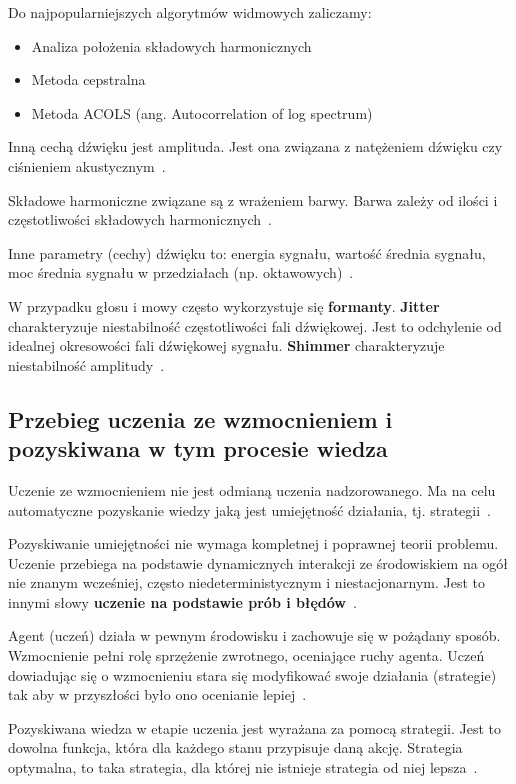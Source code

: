 \documentclass[wi]{zut}
\begin{document}
Do najpopularniejszych algorytmów widmowych zaliczamy:

\begin{itemize}
    \item Analiza położenia składowych harmonicznych
    \item Metoda cepstralna
    \item Metoda ACOLS (ang. Autocorrelation of log spectrum)
\end{itemize}

Inną cechą dźwięku jest amplituda. Jest ona związana z natężeniem dźwięku czy ciśnieniem akustycznym~\cite{Polrolniczak}.

Składowe harmoniczne związane są z wrażeniem barwy. Barwa zależy od ilości i częstotliwości składowych harmonicznych~\cite{Polrolniczak}.

Inne parametry (cechy) dźwięku to: energia sygnału, wartość średnia sygnału, moc średnia sygnału w przedziałach (np. oktawowych)~\cite{Polrolniczak}.

W przypadku głosu i mowy często wykorzystuje się \textbf{formanty}. \textbf{Jitter} charakteryzuje niestabilność częstotliwości fali dźwiękowej. Jest to odchylenie od idealnej okresowości fali dźwiękowej sygnału. \textbf{Shimmer} charakteryzuje niestabilność amplitudy~\cite{Polrolniczak}.

\subsection{Przebieg uczenia ze wzmocnieniem i pozyskiwana w tym procesie wiedza}

Uczenie ze wzmocnieniem nie jest odmianą uczenia nadzorowanego. Ma na celu automatyczne pozyskanie wiedzy jaką jest umiejętność działania, tj. strategii~\cite{Pluto}.

Pozyskiwanie umiejętności nie wymaga kompletnej i poprawnej teorii problemu. Uczenie przebiega na podstawie dynamicznych interakcji ze środowiskiem na ogół nie znanym wcześniej, często niedeterministycznym i niestacjonarnym. Jest to innymi słowy \textbf{uczenie na podstawie prób i błędów}~\cite{Pluto}.

Agent (uczeń) działa w pewnym środowisku i zachowuje się w pożądany sposób. Wzmocnienie pełni rolę sprzężenie zwrotnego, oceniające ruchy agenta. Uczeń dowiadując się o wzmocnieniu stara się modyfikować swoje działania (strategie) tak aby w przyszłości było ono ocenianie lepiej~\cite{Pluto}.

Pozyskiwana wiedza w etapie uczenia jest wyrażana za pomocą strategii. Jest to dowolna funkcja, która dla każdego stanu przypisuje daną akcję. Strategia optymalna, to taka strategia, dla której nie istnieje strategia od niej lepsza~\cite{Pluto}.
\end{document}
